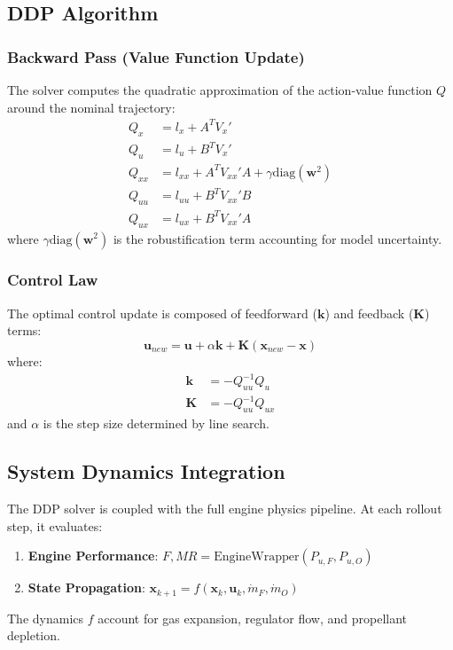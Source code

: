 \subsection{DDP Algorithm}

\subsubsection{Backward Pass (Value Function Update)}
The solver computes the quadratic approximation of the action-value function \(Q\) around the nominal trajectory:
\begin{align}
Q_x &= l_x + A^T V_x' \\
Q_u &= l_u + B^T V_x' \\
Q_{xx} &= l_{xx} + A^T V_{xx}' A + \gamma \text{diag}(\mathbf{w}^2) \\
Q_{uu} &= l_{uu} + B^T V_{xx}' B \\
Q_{ux} &= l_{ux} + B^T V_{xx}' A
\end{align}
where \(\gamma \text{diag}(\mathbf{w}^2)\) is the robustification term accounting for model uncertainty.

\subsubsection{Control Law}
The optimal control update is composed of feedforward (\(\mathbf{k}\)) and feedback (\(\mathbf{K}\)) terms:
\begin{equation}
\mathbf{u}_{new} = \mathbf{u} + \alpha \mathbf{k} + \mathbf{K}(\mathbf{x}_{new} - \mathbf{x})
\end{equation}
where:
\begin{align}
\mathbf{k} &= -Q_{uu}^{-1} Q_u \\
\mathbf{K} &= -Q_{uu}^{-1} Q_{ux}
\end{align}
and \(\alpha\) is the step size determined by line search.

\subsection{System Dynamics Integration}
The DDP solver is coupled with the full engine physics pipeline. At each rollout step, it evaluates:
\begin{enumerate}
    \item \textbf{Engine Performance}: \(F, MR = \text{EngineWrapper}(P_{u,F}, P_{u,O})\)
    \item \textbf{State Propagation}: \(\mathbf{x}_{k+1} = f(\mathbf{x}_k, \mathbf{u}_k, \dot{m}_F, \dot{m}_O)\)
\end{enumerate}
The dynamics \(f\) account for gas expansion, regulator flow, and propellant depletion.

